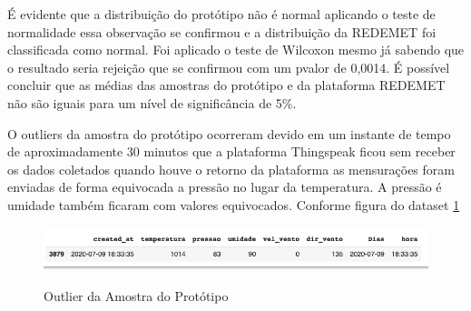 É evidente que a distribuição do protótipo não é normal aplicando o teste de normalidade essa observação se confirmou e a distribuição da REDEMET foi classificada como normal. Foi aplicado o teste de Wilcoxon mesmo já sabendo que o resultado seria rejeição que se confirmou com um pvalor de 0,0014. É possível concluir que as médias das amostras do protótipo e da plataforma REDEMET não são iguais para um nível de significância de 5\%.

O outliers da amostra do protótipo ocorreram devido em um instante de tempo de aproximadamente 30 minutos que a plataforma Thingspeak ficou sem receber os dados coletados quando houve o retorno da plataforma as mensurações foram enviadas de forma equivocada a pressão no lugar da temperatura. A pressão é umidade também ficaram com valores equivocados. Conforme figura do dataset \ref{fig:outlier}

\begin{figure} [!h]
    \centering
    \caption{Outlier da Amostra do Protótipo}    
    \includegraphics [scale = 0.5] {Figuras/outlier.png}
    \label{fig:outlier}
\end{figure}


